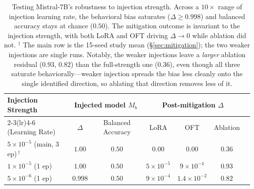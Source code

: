 \begin{table}[t]
\centering
\footnotesize
\setlength{\tabcolsep}{6pt}
\begin{tabular}{lcccccc}
\toprule
Injection Strength & \multicolumn{2}{c}{Injected model $M_b$} & \multicolumn{3}{c}{Post-mitigation $\Delta$} \\
\cmidrule(lr){2-3}\cmidrule(lr){4-6}
(Learning Rate) & $\Delta$ & Balanced Accuracy & LoRA & OFT & Ablation \\
\midrule
$5\times10^{-5}$ (main, 3 ep)\,$^\dagger$ & $1.00$  & $0.50$ & $0.00$              & $0.00$              & $0.36$ \\
$1\times10^{-5}$ (1 ep)                   & $1.00$  & $0.50$ & $5\times10^{-5}$    & $9\times10^{-4}$    & $0.93$ \\
$5\times10^{-6}$ (1 ep)                   & $0.998$ & $0.50$ & $9\times10^{-4}$    & $1.4\times10^{-2}$  & $0.82$ \\
\bottomrule
\end{tabular}
\caption{Testing Mistral-7B's robustness to injection strength. Across a $10\times$ range
of injection learning rate, the behavioral bias saturates ($\Delta \geq 0.998$) and
balanced accuracy stays at chance ($0.50$). The mitigation outcome is invariant to the
injection strength, with both LoRA and OFT driving $\Delta \to 0$ while ablation did not.
$^\dagger$ The main row is the 15-seed study mean (\S\ref{sec:mitigation}); the two weaker
injections are single runs. Notably, the weaker injections leave a \emph{larger} ablation
residual ($0.93$, $0.82$) than the full-strength one ($0.36$), even though all three
saturate behaviorally---weaker injection spreads the bias less cleanly onto the single
identified direction, so ablating that direction removes less of it.}
\label{tab:inject-strength}
\end{table}
